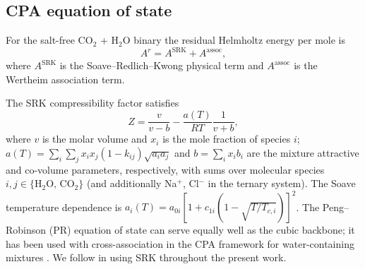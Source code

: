 \documentclass[preprint,12pt,authoryear]{elsarticle}
\begin{document}
\subsection{CPA equation of state}
\label{sec:cpa}

For the salt-free CO$_2$ + H$_2$O binary the residual Helmholtz energy per mole is
\begin{equation}
  A^r = A^{\text{SRK}} + A^{\text{assoc}},
  \label{eq:Ar_cpa}
\end{equation}
where $A^{\text{SRK}}$ is the Soave--Redlich--Kwong \citep{Soave1972} physical term and
$A^{\text{assoc}}$ is the Wertheim association term.

The SRK compressibility factor satisfies
\begin{equation}
  Z = \frac{v}{v-b} - \frac{a(T)}{RT}\frac{1}{v+b},
  \label{eq:Z_srk}
\end{equation}
where $v$ is the molar volume and $x_i$ is the mole fraction of species $i$;
$a(T) = \sum_i \sum_j x_i x_j (1-k_{ij})\sqrt{a_i a_j}$
and $b = \sum_i x_i b_i$ are the mixture attractive and co-volume parameters, respectively,
with sums over molecular species $i, j \in \{\text{H}_2\text{O},\, \text{CO}_2\}$
(and additionally Na$^+$, Cl$^-$ in the ternary system).
The Soave temperature dependence is
$a_i(T) = a_{0i}[1 + c_{1i}(1 - \sqrt{T/T_{c,i}})]^2$.
The Peng--Robinson (PR) equation of state \citep{PengRobinson1976} can serve equally well as
the cubic backbone; it has been used with cross-association in the CPA framework for
water-containing mixtures \citep{LiFiroozabadi2009,moortgat2018reservoir, nasrabadi2016new, moortgat2025vapor, moortgat2011three}.
We follow \citet{Coelho2025} in using SRK throughout the present work.
\end{document}
